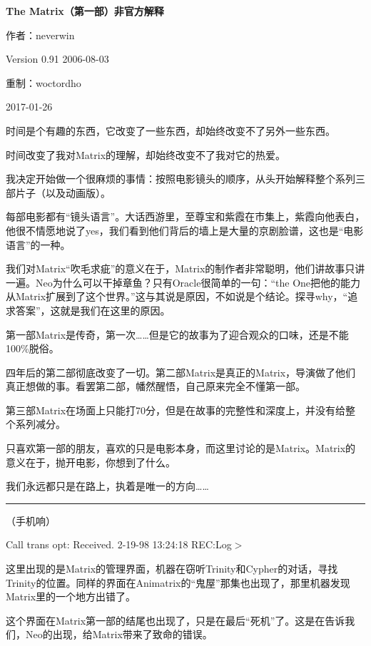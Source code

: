 \documentclass{ctexart}
\newcommand{\myparsep}{\noindent \rule[0.5ex]{\linewidth}{1pt}}
\newenvironment{myquote}{\color{green} \setlength{\leftskip}{6em} \setlength{\rightskip}{4em} \setlength{\parindent}{-2em}}{\par}
\begin{document}
\centerline{\bf \fontsize{15.75pt} \baselineskip \selectfont The Matrix（第一部）非官方解释}
\vspace{12pt}
\centerline{作者：neverwin}
\centerline{Version 0.91 2006-08-03}
\centerline{重制：woctordho}
\centerline{2017-01-26}
\vspace{12pt}

时间是个有趣的东西，它改变了一些东西，却始终改变不了另外一些东西。

时间改变了我对Matrix的理解，却始终改变不了我对它的热爱。

我决定开始做一个很麻烦的事情：按照电影镜头的顺序，从头开始解释整个系列三部片子（以及动画版）。

每部电影都有“镜头语言”。大话西游里，至尊宝和紫霞在市集上，紫霞向他表白，他很不情愿地说了yes，我们看到他们背后的墙上是大量的京剧脸谱，这也是“电影语言”的一种。

我们对Matrix“吹毛求疵”的意义在于，Matrix的制作者非常聪明，他们讲故事只讲一遍。Neo为什么可以干掉章鱼？只有Oracle很简单的一句：“the One把他的能力从Matrix扩展到了这个世界。”这与其说是原因，不如说是个结论。探寻why，“追求答案”，这就是我们在这里的原因。

第一部Matrix是传奇，第一次……但是它的故事为了迎合观众的口味，还是不能100\%脱俗。

四年后的第二部彻底改变了一切。第二部Matrix是真正的Matrix，导演做了他们真正想做的事。看罢第二部，幡然醒悟，自己原来完全不懂第一部。

第三部Matrix在场面上只能打70分，但是在故事的完整性和深度上，并没有给整个系列减分。

只喜欢第一部的朋友，喜欢的只是电影本身，而这里讨论的是Matrix。Matrix的意义在于，抛开电影，你想到了什么。

我们永远都只是在路上，执着是唯一的方向……

\myparsep

\begin{myquote}
（手机响）

Call trans opt: Received. 2-19-98 13:24:18 REC:Log$>$
\end{myquote}

这里出现的是Matrix的管理界面，机器在窃听Trinity和Cypher的对话，寻找Trinity的位置。同样的界面在Animatrix的“鬼屋”那集也出现了，那里机器发现Matrix里的一个地方出错了。

这个界面在Matrix第一部的结尾也出现了，只是在最后“死机”了。这是在告诉我们，Neo的出现，给Matrix带来了致命的错误。
\end{document}
